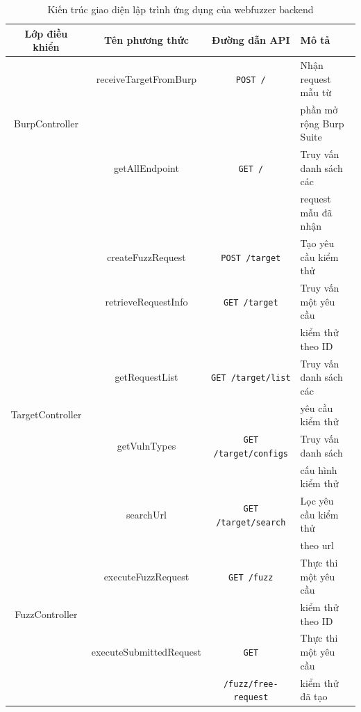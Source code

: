 \begin{table}[ht]
    \centering
    \caption{Kiến trúc giao diện lập trình ứng dụng của webfuzzer backend}
    \label{tab:api-design}
    \begin{tabular}[ht]{cccl}
        \toprule[1pt]\midrule[0.3pt]
            \textbf{Lớp điều khiển}&\textbf{Tên phương thức}&\textbf{Đường dẫn API}&\textbf{Mô tả}\\ 
        \midrule
            {}&receiveTargetFromBurp&\colorbox{gray!30}{\texttt{POST /}}&Nhận request mẫu từ\\
            BurpController&{}&{}& phần mở rộng Burp Suite\\
            \addlinespace
            {}&getAllEndpoint&\colorbox{gray!30}{\texttt{GET /}}&Truy vấn danh sách các \\
            {}&{}&{}&request mẫu đã nhận\\
            \midrule[0.3pt]
            {}&createFuzzRequest&\colorbox{gray!30}{\texttt{POST /target}}&Tạo yêu cầu kiểm thử\\
            \addlinespace
            {}&retrieveRequestInfo&\colorbox{gray!30}{\texttt{GET /target}}&Truy vấn một yêu cầu\\
            {}&{}&{}& kiểm thử theo ID\\
            \addlinespace
            {}&getRequestList&\colorbox{gray!30}{\texttt{GET /target/list}}&Truy vấn danh sách các\\
            TargetController&{}&{}&yêu cầu kiểm thử\\
            \addlinespace
            {}&getVulnTypes&\colorbox{gray!30}{\texttt{GET /target/configs}}&Truy vấn danh sách\\
            {}&{}&{}&cấu hình kiểm thử\\
            \addlinespace
            {}&searchUrl&\colorbox{gray!30}{\texttt{GET /target/search}}&Lọc yêu cầu kiểm thử\\
            {}&{}&{}&theo \acrshort{url}\\
            \midrule[0.3pt]
            {}&executeFuzzRequest&\colorbox{gray!30}{\texttt{GET /fuzz}}&Thực thi một yêu cầu\\
            FuzzController&{}&{}&kiểm thử theo ID\\
            \addlinespace
            {}&executeSubmittedRequest&\colorbox{gray!30}{\texttt{GET}}&Thực thi một yêu cầu\\
            {}&{}&\colorbox{gray!30}{\texttt{/fuzz/free-request}}&kiểm thử đã tạo\\
        \midrule[0.3pt]\bottomrule[1pt]
    \end{tabular}
\end{table}
